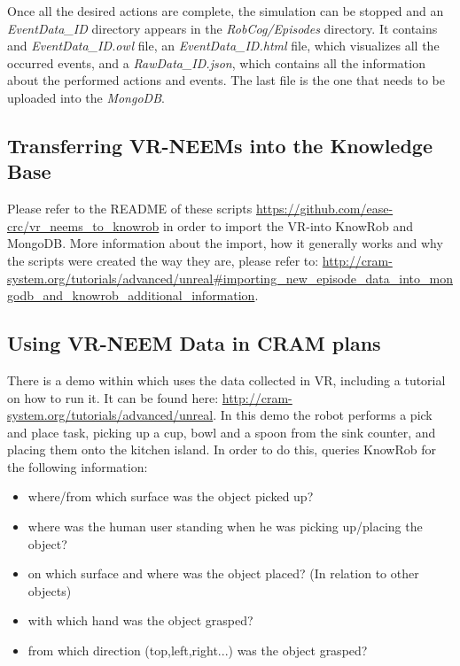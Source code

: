 Once all the desired actions are complete, the simulation can be stopped and an \textit{EventData\_ID} directory appears in the \textit{RobCog/Episodes} directory. It contains and \textit{EventData\_ID.owl} file, an \textit{EventData\_ID.html} file, which visualizes all the occurred events, and a \textit{RawData\_ID.json}, which contains all the information about the performed actions and events. The last file is the one that needs to be uploaded into the \textit{MongoDB}. 


\subsection{Transferring VR-NEEMs into the Knowledge Base}
Please refer to the README of these scripts \url{https://github.com/ease-crc/vr_neems_to_knowrob} in order to import the VR-\neems into KnowRob and MongoDB. More information about the import, how it generally works and why the scripts were created the way they are, please refer to: \url{http://cram-system.org/tutorials/advanced/unreal#importing_new_episode_data_into_mongodb_and_knowrob_additional_information}. 

\subsection{Using VR-NEEM Data in CRAM plans}
There is a demo within \cram which uses the data collected in VR, including a tutorial on how to run it. It can be found here: \url{http://cram-system.org/tutorials/advanced/unreal}. In this demo the robot performs a pick and place task, picking up a cup, bowl and a spoon from the sink counter, and placing them onto the kitchen island. In order to do this, \cram queries KnowRob for the following information: 

\begin{itemize}
	\item where/from which surface was the object picked up?
	\item where was the human user standing when he was picking up/placing the object?
	\item on which surface and where was the object placed? (In relation to other objects)
	\item with which hand was the object grasped?
	\item from which direction (top,left,right...) was the object grasped?
\end{itemize}

